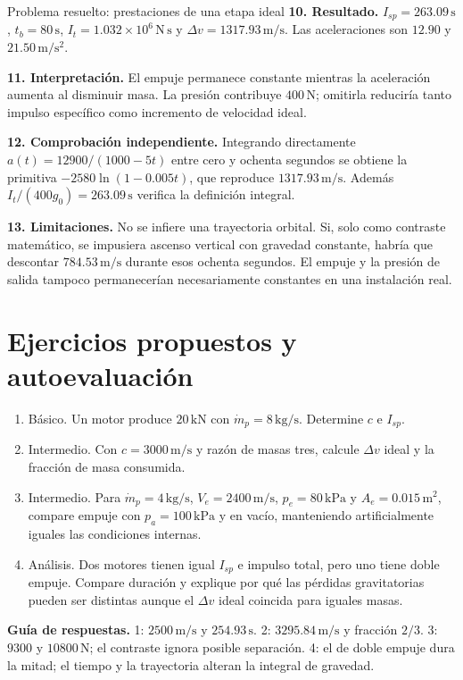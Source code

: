 \begin{studiumworked}{Problema resuelto: prestaciones de una etapa ideal}
\textbf{10. Resultado.} $I_{sp}=263.09\,\mathrm{s}$, $t_b=80\,\mathrm{s}$, $I_t=1.032\times10^6\,\mathrm{N\,s}$ y $\Delta v=1317.93\,\mathrm{m/s}$. Las aceleraciones son $12.90$ y $21.50\,\mathrm{m/s^2}$.

\textbf{11. Interpretación.} El empuje permanece constante mientras la aceleración aumenta al disminuir masa. La presión contribuye $400\,\mathrm{N}$; omitirla reduciría tanto impulso específico como incremento de velocidad ideal.

\textbf{12. Comprobación independiente.} Integrando directamente $a(t)=12900/(1000-5t)$ entre cero y ochenta segundos se obtiene la primitiva $-2580\ln(1-0.005t)$, que reproduce $1317.93\,\mathrm{m/s}$. Además $I_t/(400g_0)=263.09\,\mathrm{s}$ verifica la definición integral.

\textbf{13. Limitaciones.} No se infiere una trayectoria orbital. Si, solo como contraste matemático, se impusiera ascenso vertical con gravedad constante, habría que descontar $784.53\,\mathrm{m/s}$ durante esos ochenta segundos. El empuje y la presión de salida tampoco permanecerían necesariamente constantes en una instalación real.


\end{studiumworked}

\section{Ejercicios propuestos y autoevaluación}
\begin{enumerate}
\item Básico. Un motor produce $20\,\mathrm{kN}$ con $\dot m_p=8\,\mathrm{kg/s}$. Determine $c$ e $I_{sp}$.
\item Intermedio. Con $c=3000\,\mathrm{m/s}$ y razón de masas tres, calcule $\Delta v$ ideal y la fracción de masa consumida.
\item Intermedio. Para $\dot m_p=4\,\mathrm{kg/s}$, $V_e=2400\,\mathrm{m/s}$, $p_e=80\,\mathrm{kPa}$ y $A_e=0.015\,\mathrm{m^2}$, compare empuje con $p_a=100\,\mathrm{kPa}$ y en vacío, manteniendo artificialmente iguales las condiciones internas.
\item Análisis. Dos motores tienen igual $I_{sp}$ e impulso total, pero uno tiene doble empuje. Compare duración y explique por qué las pérdidas gravitatorias pueden ser distintas aunque el $\Delta v$ ideal coincida para iguales masas.
\end{enumerate}
\textbf{Guía de respuestas.} 1: $2500\,\mathrm{m/s}$ y $254.93\,\mathrm{s}$. 2: $3295.84\,\mathrm{m/s}$ y fracción $2/3$. 3: $9300$ y $10800\,\mathrm{N}$; el contraste ignora posible separación. 4: el de doble empuje dura la mitad; el tiempo y la trayectoria alteran la integral de gravedad.

